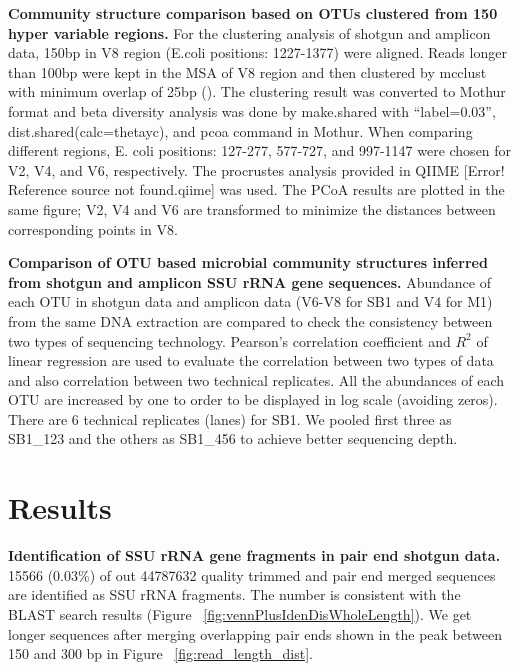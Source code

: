 \documentclass[12pt]{article}
\begin{document}
  {\bf Community structure comparison based on OTUs clustered from 150 hyper variable regions. }
  For the clustering analysis of shotgun and amplicon data, 150bp in V8 region (E.coli positions: 1227-1377) were aligned. Reads longer than 100bp were kept in the MSA of V8 region and then clustered by mcclust with minimum overlap of 25bp (\cite{rdp2009}). The clustering result was converted to Mothur format and beta diversity analysis was done by make.shared with ``label=0.03'', dist.shared(calc=thetayc), and pcoa command in Mothur. When comparing different regions, E. coli positions: 127-277, 577-727, and 997-1147 were chosen for V2, V4, and V6, respectively. The procrustes analysis provided in QIIME [Error! Reference source not found.qiime] was used. The PCoA results are plotted in the same figure; V2, V4 and V6 are transformed to minimize the distances between corresponding points in V8.

  {\bf Comparison of OTU based microbial community structures inferred from shotgun and amplicon SSU rRNA gene sequences. }
Abundance of each OTU in shotgun data and amplicon data (V6-V8 for SB1 and V4 for M1) from the same DNA extraction are compared to check the consistency between two types of sequencing technology. Pearson’s correlation coefficient and $R^2$ of linear regression are used to evaluate the correlation between two types of data and also correlation between two technical replicates. All the abundances of each OTU are increased by one to order to be displayed in log scale (avoiding zeros). There are 6 technical replicates (lanes) for SB1. We pooled first three as SB1\_123 and the others as SB1\_456 to achieve better sequencing depth.

\section{Results}
  {\bf Identification of SSU rRNA gene fragments in pair end shotgun data. }
  15566  (0.03\%) of out 44787632 quality trimmed and pair end merged sequences are identified as SSU rRNA fragments. The number is consistent with the BLAST search results (Figure ~\ref{fig:vennPlusIdenDisWholeLength}). We get longer sequences after merging overlapping pair ends shown in the peak between 150 and 300 bp in Figure ~\ref{fig:read_length_dist}.
\end{document}
